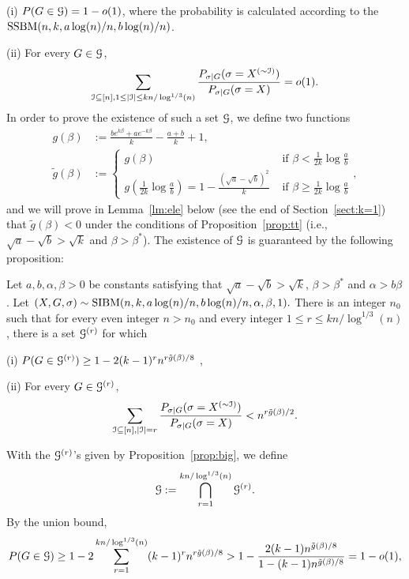 \documentclass{article}
\begin{document}
\noindent (i)
$P(G\in\mathcal{G})=1-o(1)$, where the probability is calculated according to the $\SSBM(n, k,a\log(n)/n, \linebreak[4] b\log(n)/n)$.

\noindent (ii)
For every $G\in\mathcal{G}$,
$$
\sum_{\mathcal{I}\subseteq[n],1\le |\mathcal{I}|\le kn/\log^{1/3}(n)}
\frac{P_{\sigma|G}(\sigma=X^{(\sim\mathcal{I})})}{P_{\sigma|G}(\sigma=X)} =o(1) .
$$
In order to prove the existence of such a set $\mathcal{G}$, we define two functions
\begin{equation}  \label{eq:gbt}
\begin{aligned}
g(\beta) & := \frac{b e^{k\beta}+a e^{-k\beta}}{k}-\frac{a+b}{k}+1 , \\
\tilde{g}(\beta) & :=\left\{
\begin{array}{cc}
  g(\beta)   & \text{~if~} \beta< \frac{1}{2k}\log\frac{a}{b} \\
  g(\frac{1}{2k}\log\frac{a}{b})=1-\frac{(\sqrt{a}-\sqrt{b})^2}{k}  & \text{~if~} \beta\ge \frac{1}{2k}\log\frac{a}{b}
\end{array}
\right. ,
\end{aligned}
\end{equation}
and we will prove in Lemma~\ref{lm:ele} below (see the end of Section~\ref{sect:k=1}) that $\tilde{g}(\beta)<0$ under the conditions of Proposition~\ref{prop:tt} (i.e., $\sqrt{a}-\sqrt{b} > \sqrt{k}$ and $\beta>\beta^\ast$).
The existence of $\mathcal{G}$ is guaranteed by the following proposition:
\begin{proposition} \label{prop:big}
Let $a,b,\alpha,\beta> 0$ be constants satisfying that $\sqrt{a}-\sqrt{b} > \sqrt{k}$, $\beta>\beta^\ast$ and $\alpha>b\beta$. 
Let 
$
(X,G,\sigma) \sim \operatorname{SIBM}(n,k,a\log(n)/n, b\log(n)/n,\alpha,\beta, 1) .
$
There is an integer $n_0$ such that for every even integer $n>n_0$ and  every integer $1\le r\le kn/\log^{1/3}(n)$, there is a set $\mathcal{G}^{(r)}$ for which

\noindent (i)
$P(G\in\mathcal{G}^{(r)}) \ge 1- 2(k-1)^r n^{r\tilde{g}(\beta)/8}$ ,

\noindent (ii) For every $G\in\mathcal{G}^{(r)}$,
$$
\sum_{\mathcal{I}\subseteq[n],|\mathcal{I}|=r}
\frac{P_{\sigma|G}(\sigma=X^{(\sim \mathcal{I})} )}
{P_{\sigma|G}(\sigma=X)} <
n^{r \tilde{g}(\beta) /2} .
$$
\end{proposition}
With the $\mathcal{G}^{(r)}$'s given by Proposition~\ref{prop:big}, we
define 
$$
\mathcal{G}:=\bigcap_{r=1}^{kn/\log^{1/3}(n)} \mathcal{G}^{(r)} .
$$
By the union bound,
$$
P(G\in\mathcal{G})\ge 1-2 \sum_{r=1}^{kn/\log^{1/3}(n)} (k-1)^rn^{r\tilde{g}(\beta)/8}
> 1- \frac{2 (k-1)n^{\tilde{g}(\beta)/8}}{1-(k-1)n^{\tilde{g}(\beta)/8}}
=1-o(1),
$$
\end{document}
